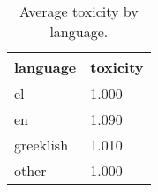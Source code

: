 \begin{table}
\caption{Average toxicity by language.}
\label{tab::toxic_lang}
\begin{tabular}{|p{3.5cm}|p{1cm}|}
\toprule
language & toxicity \\
\midrule
el & 1.000 \\
en & 1.090 \\
greeklish & 1.010 \\
other & 1.000 \\
\bottomrule
\end{tabular}
\end{table}
